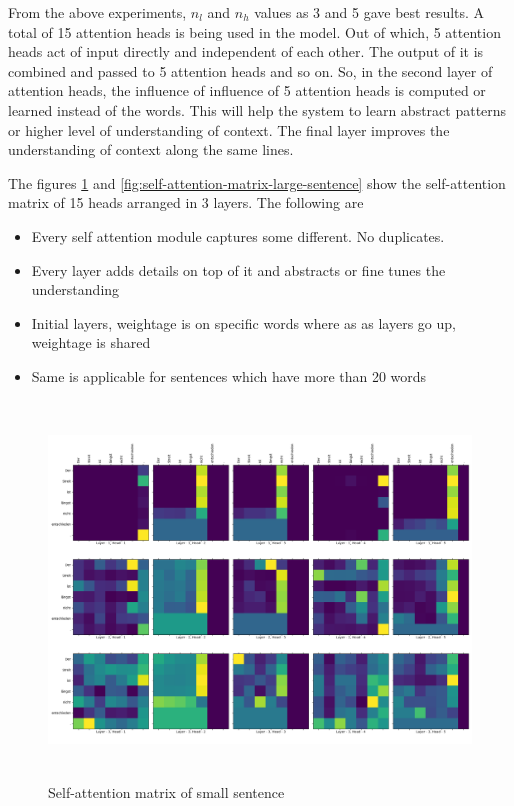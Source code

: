\documentclass[a4paper, 11pt]{article}
\begin{document}
From the above experiments, $n_l$ and $n_h$ values as 3 and 5 gave best results. A total of 15 attention heads is being used in the model. Out of which, 5 attention heads act of input directly and independent of each other. The output of it is combined and passed to 5 attention heads and so on.  So, in the second layer of attention heads, the influence of influence of 5 attention heads is computed or learned instead of the words. This will help the system to learn abstract patterns or higher level of understanding of context. The final layer improves the understanding of context along the same lines.

The figures \ref{fig:self-attention-matrix-small-sentence} and \ref{fig:self-attention-matrix-large-sentence} show the self-attention matrix of 15 heads arranged in 3 layers. The following are 

\begin{itemize}
\item Every self attention module captures some different. No duplicates. 
\item Every layer adds details on top of it and abstracts or fine tunes the understanding
\item Initial layers, weightage is on specific words where as as layers go up, weightage is shared
\item Same is applicable for sentences which have more than 20 words
\end{itemize}

\begin{figure}[H]
    \centering
    \includegraphics[width=\textwidth,height=10cm,keepaspectratio=true]
    {self-attention-matrix-1.png}
    \caption{
        Self-attention matrix of small sentence
    }
    \label{fig:self-attention-matrix-small-sentence}
\end{figure}
\end{document}
